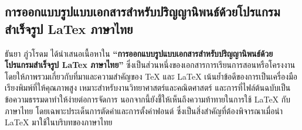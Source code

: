 \subsection{การออกแบบรูปแบบเอกสารสำหรับปริญญานิพนธ์ด้วยโปรแกรมสำเร็จรูป LaTex ภาษาไทย}
\hspace*{1.5em} %
ธันยา ภู่วโรดม ได้นำเสนอเนื้อหาใน \textbf{“การออกแบบรูปแบบเอกสารสำหรับปริญญานิพนธ์ด้วยโปรแกรมสำเร็จรูป LaTex ภาษาไทย”} ซึ่งเป็นส่วนหนึ่งของเอกสารการเรียนการสอนหรือโครงงาน โดยให้ภาพรวมเกี่ยวกับที่มาและความสำคัญของ TeX และ LaTeX เน้นย้ำข้อดีของการเป็นเครื่องมือเรียงพิมพ์ที่ให้คุณภาพสูง เหมาะสำหรับงานวิทยาศาสตร์และคณิตศาสตร์ และการที่ไฟล์ต้นฉบับเป็นข้อความธรรมดาทำให้ง่ายต่อการจัดการ นอกจากนี้ยังชี้ให้เห็นถึงความท้าทายในการใช้ LaTeX กับภาษาไทย โดยเฉพาะประเด็นการตัดคำและการตั้งค่าฟอนต์ ซึ่งเป็นสิ่งสำคัญที่ต้องพิจารณาเมื่อนำ LaTeX มาใช้ในบริบทของภาษาไทย \parencite{Tanya2008}
